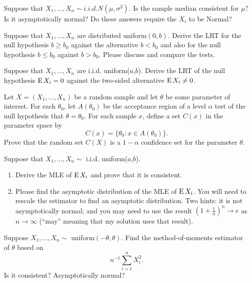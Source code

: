 \begin{hw}
  Suppose that $X_1,\dots,X_n \sim i.i.d. N(\mu, \sigma^2)$. Is
  the sample median consistent for $\mu$? Is it asymptotically
  normal? Do these answers require the $X_i$ to be Normal?
\end{hw}

\begin{hw}
  Suppose that $X_1,\dots,X_n$ are distributed uniform$(0,b)$.
  Derive the LRT for the null hypothesis $b \geq b_0$ against the
  alternative $b < b_0$ and also for the null hypothesis $b \leq b_0$
  against $b > b_0$. Please discuss and compare the tests.
\end{hw}

\begin{hw}
  Suppose that $X_1,\dots,X_n$ are i.i.d. uniform($a$,$b$).
  Derive the LRT of the null hypothesis $\operatorname{E} X_i = 0$ against the
  two-sided alternative $\operatorname{E} X_i \neq 0$.
\end{hw}

\begin{hw}
  Let $X = (X_1,\dots,X_n)$ be a random sample and let $\theta$ be
  some parameter of interest. For each $\theta_0$, let $A(\theta_0)$
  be the acceptance region of a level $\alpha$ test of the null
  hypothesis that $\theta = \theta_0$. For each sample $x$, define a
  set $C(x)$ in the parameter space by
  \begin{equation}
     C(x) = \{ \theta_0 : x \in A(\theta_0) \}.
  \end{equation}
  Prove that the random set $C(X)$ is a $1-\alpha$ confidence set for the
  parameter $\theta$.
\end{hw}

\begin{hw}
  Suppose that $X_1,...,X_n \sim$ i.i.d. uniform($a$,$b$).
  \begin{enumerate}
  \item Derive the MLE of $\operatorname{E} X_i$ and prove that it is consistent.
  \item Please find the asymptotic distribution of the MLE of $\operatorname{E}
    X_i$. You will need to rescale the estimator to find an
    asymptotic distribution. Two hints: it is not asymptotically
    normal; and you may need to use the result $(1 + \tfrac{1}{n})^n \to
    e$ as $n \to \infty$ (``may'' meaning that my solution uses that result).
  \end{enumerate}
\end{hw}

\begin{hw}
  Suppose $X_1,...,X_n \sim$ uniform$(-\theta, \theta)$. Find the
  method-of-moments estimator of $\theta$ based on
  \begin{equation*}
    n^{-1} \sum_{i=1}^n X_i^2.
  \end{equation*}
  Is it consistent? Asymptotically normal?
\end{hw}

